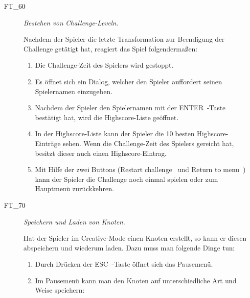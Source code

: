\begin{description}
	\item[FT\_60] \textit{Bestehen von Challenge-Leveln.} \hfill\\
	
	\label{FT:60}
	
	Nachdem der Spieler die letzte Transformation zur Beendigung der Challenge getätigt hat, reagiert das Spiel folgendermaßen:
	
	\begin{enumerate} 
	
	    \item Die Challenge-Zeit des Spielers wird gestoppt.
	    
		\item Es öffnet sich ein Dialog, welcher den Spieler auffordert seinen Spielernamen einzugeben.
		
		\item Nachdem der Spieler den Spielernamen mit der \glqq ENTER\grqq~-Taste bestätigt hat, wird die Highscore-Liste geöffnet.
		
		\item In der Highscore-Liste kann der Spieler die 10 besten Highscore-Einträge sehen. Wenn die Challenge-Zeit des Spielers gereicht hat, besitzt dieser auch einen Highscore-Eintrag.
		
		\item Mit Hilfe der zwei Buttons (\glqq Restart challenge\grqq~ und \glqq Return to menu\grqq~) kann der Spieler die Challenge noch einmal spielen oder zum Hauptmenü zurückkehren.
		~\\
			
	\end{enumerate}
	
	
\clearpage


	\item[FT\_70] \textit{Speichern und Laden von Knoten.} \hfill\\
	
	\label{FT:70}
	
	Hat der Spieler im Creative-Mode einen Knoten erstellt, so kann er diesen abspeichern und wiederum laden. Dazu muss man folgende Dinge tun:
	
		\begin{enumerate} 
	
		\item  Durch Drücken der \glqq ESC\grqq~-Taste öffnet sich das Pausemenü.
		\item Im Pausemenü kann man den Knoten auf unterschiedliche Art und Weise speichern:
		 

\end{enumerate}
\end{description}
